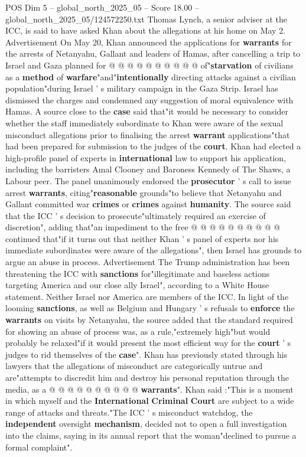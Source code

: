 \begin{textsample}{POS Dim 5 – global\_north\_2025\_05 – Score 18.00 – global\_north\_2025\_05/124572250.txt}
Thomas Lynch, a senior adviser at the ICC, is said to have asked Khan about the allegations at his home on May 2.
Advertisement On May 20, Khan announced the applications for \textbf{warrants} for the arrests of Netanyahu, Gallant and leaders of Hamas, after cancelling a trip to Israel and Gaza planned for @ @ @ @ @ @ @ @ @ @ of"\textbf{starvation} of civilians as a \textbf{method} of \textbf{warfare}"and"\textbf{intentionally} directing attacks against a civilian population"during Israel ' s military campaign in the Gaza Strip.
Israel has dismissed the charges and condemned any suggestion of moral equivalence with Hamas.
A source close to the \textbf{case} said that"it would be necessary to consider whether the staff immediately subordinate to Khan were aware of the sexual misconduct allegations prior to finalising the arrest \textbf{warrant} applications"that had been prepared for submission to the judges of the \textbf{court}.
Khan had elected a high-profile panel of experts in \textbf{international} law to support his application, including the barristers Amal Clooney and Baroness Kennedy of The Shaws, a Labour peer.
The panel unanimously endorsed the \textbf{prosecutor} ' s call to issue arrest \textbf{warrants}, citing"\textbf{reasonable} grounds"to believe that Netanyahu and Gallant committed war \textbf{crimes} or \textbf{crimes} against \textbf{humanity}.
The source said that the ICC ' s decision to prosecute"ultimately required an exercise of discretion", adding that"an impediment to the free @ @ @ @ @ @ @ @ @ @ continued that"if it turns out that neither Khan ' s panel of experts nor his immediate subordinates were aware of the allegations", then Israel has grounds to argue an abuse in process.
Advertisement The Trump administration has been threatening the ICC with \textbf{sanctions} for"illegitimate and baseless actions targeting America and our close ally Israel", according to a White House statement.
Neither Israel nor America are members of the ICC.
In light of the looming \textbf{sanctions}, as well as Belgium and Hungary ' s refusals to \textbf{enforce} the \textbf{warrants} on visits by Netanyahu, the source added that the standard required for showing an abuse of process was, as a rule,"extremely high"but would probably be relaxed"if it would present the most efficient way for the \textbf{court} ' s judges to rid themselves of the \textbf{case}".
Khan has previously stated through his lawyers that the allegations of misconduct are categorically untrue and are"attempts to discredit him and destroy his personal reputation through the media, as a @ @ @ @ @ @ @ @ @ @ \textbf{warrants}".
Khan said :"This is a moment in which myself and the \textbf{International} \textbf{Criminal} \textbf{Court} are subject to a wide range of attacks and threats."The ICC ' s misconduct watchdog, the \textbf{independent} oversight \textbf{mechanism}, decided not to open a full investigation into the claims, saying in its annual report that the woman"declined to pursue a formal complaint".

\end{textsample}

